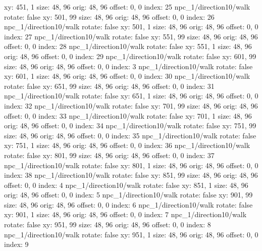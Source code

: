  xy: 451, 1
  size: 48, 96
  orig: 48, 96
  offset: 0, 0
  index: 25
npc_1/direction10/walk
  rotate: false
  xy: 501, 99
  size: 48, 96
  orig: 48, 96
  offset: 0, 0
  index: 26
npc_1/direction10/walk
  rotate: false
  xy: 501, 1
  size: 48, 96
  orig: 48, 96
  offset: 0, 0
  index: 27
npc_1/direction10/walk
  rotate: false
  xy: 551, 99
  size: 48, 96
  orig: 48, 96
  offset: 0, 0
  index: 28
npc_1/direction10/walk
  rotate: false
  xy: 551, 1
  size: 48, 96
  orig: 48, 96
  offset: 0, 0
  index: 29
npc_1/direction10/walk
  rotate: false
  xy: 601, 99
  size: 48, 96
  orig: 48, 96
  offset: 0, 0
  index: 3
npc_1/direction10/walk
  rotate: false
  xy: 601, 1
  size: 48, 96
  orig: 48, 96
  offset: 0, 0
  index: 30
npc_1/direction10/walk
  rotate: false
  xy: 651, 99
  size: 48, 96
  orig: 48, 96
  offset: 0, 0
  index: 31
npc_1/direction10/walk
  rotate: false
  xy: 651, 1
  size: 48, 96
  orig: 48, 96
  offset: 0, 0
  index: 32
npc_1/direction10/walk
  rotate: false
  xy: 701, 99
  size: 48, 96
  orig: 48, 96
  offset: 0, 0
  index: 33
npc_1/direction10/walk
  rotate: false
  xy: 701, 1
  size: 48, 96
  orig: 48, 96
  offset: 0, 0
  index: 34
npc_1/direction10/walk
  rotate: false
  xy: 751, 99
  size: 48, 96
  orig: 48, 96
  offset: 0, 0
  index: 35
npc_1/direction10/walk
  rotate: false
  xy: 751, 1
  size: 48, 96
  orig: 48, 96
  offset: 0, 0
  index: 36
npc_1/direction10/walk
  rotate: false
  xy: 801, 99
  size: 48, 96
  orig: 48, 96
  offset: 0, 0
  index: 37
npc_1/direction10/walk
  rotate: false
  xy: 801, 1
  size: 48, 96
  orig: 48, 96
  offset: 0, 0
  index: 38
npc_1/direction10/walk
  rotate: false
  xy: 851, 99
  size: 48, 96
  orig: 48, 96
  offset: 0, 0
  index: 4
npc_1/direction10/walk
  rotate: false
  xy: 851, 1
  size: 48, 96
  orig: 48, 96
  offset: 0, 0
  index: 5
npc_1/direction10/walk
  rotate: false
  xy: 901, 99
  size: 48, 96
  orig: 48, 96
  offset: 0, 0
  index: 6
npc_1/direction10/walk
  rotate: false
  xy: 901, 1
  size: 48, 96
  orig: 48, 96
  offset: 0, 0
  index: 7
npc_1/direction10/walk
  rotate: false
  xy: 951, 99
  size: 48, 96
  orig: 48, 96
  offset: 0, 0
  index: 8
npc_1/direction10/walk
  rotate: false
  xy: 951, 1
  size: 48, 96
  orig: 48, 96
  offset: 0, 0
  index: 9

